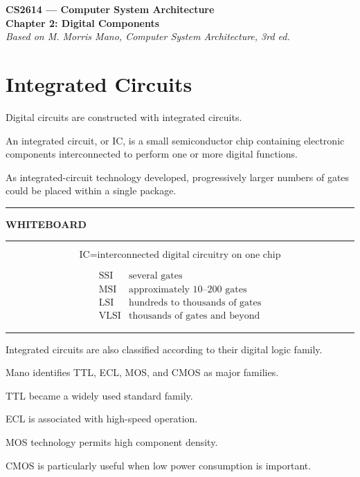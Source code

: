 \documentclass[11pt]{article}
\newenvironment{whiteboard}
{
    \par\medskip
    \hrule
    \vspace{0.35em}
    \noindent\textbf{\large WHITEBOARD}
    \par\vspace{0.3em}
    \hrule
    \vspace{0.65em}
}
{
    \vspace{0.45em}
    \hrule
    \par\medskip
}
\begin{document}
\begin{center}
    {\LARGE\textbf{CS2614 --- Computer System Architecture}}\\[0.45em]
    {\Large\textbf{Chapter 2: Digital Components}}\\[0.45em]
    \textit{Based on M. Morris Mano,
    Computer System Architecture, 3rd ed.}
\end{center}

\section{Integrated Circuits}

Digital circuits are constructed with integrated circuits.

An integrated circuit, or IC, is a small semiconductor chip containing
electronic components interconnected to perform one or more digital
functions.

As integrated-circuit technology developed, progressively larger numbers of
gates could be placed within a single package.

\begin{whiteboard}

\[
\boxed{
\text{IC}
=
\text{interconnected digital circuitry on one chip}
}
\]

\[
\begin{array}{c|l}
\text{SSI}
&
\text{several gates}
\\
\text{MSI}
&
\text{approximately }10\text{--}200\text{ gates}
\\
\text{LSI}
&
\text{hundreds to thousands of gates}
\\
\text{VLSI}
&
\text{thousands of gates and beyond}
\end{array}
\]

\end{whiteboard}

Integrated circuits are also classified according to their digital logic
family.

Mano identifies TTL, ECL, MOS, and CMOS as major families.

TTL became a widely used standard family.

ECL is associated with high-speed operation.

MOS technology permits high component density.

CMOS is particularly useful when low power consumption is important.
\end{document}
